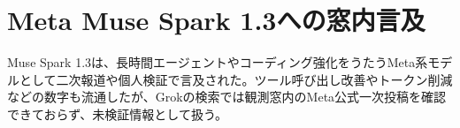 \section{Meta Muse Spark 1.3への窓内言及}

Muse Spark 1.3は、長時間エージェントやコーディング強化をうたうMeta系モデルとして二次報道や個人検証で言及された。ツール呼び出し改善やトークン削減などの数字も流通したが、Grokの検索では観測窓内のMeta公式一次投稿を確認できておらず、未検証情報として扱う。


